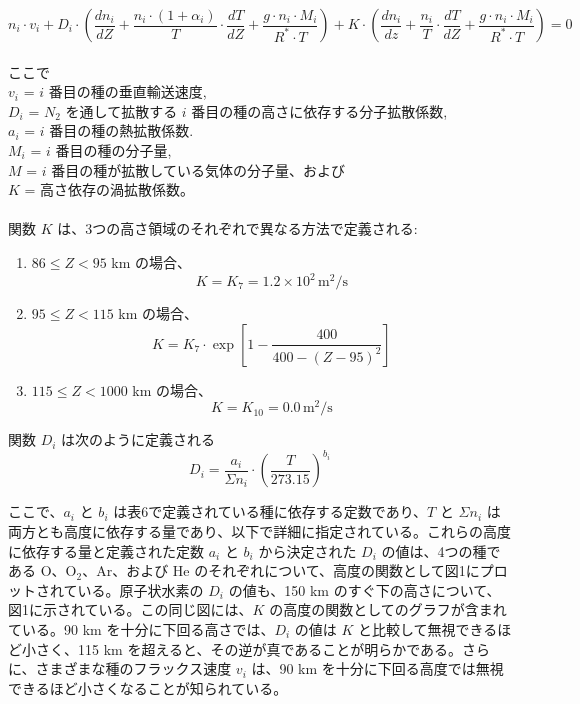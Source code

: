 \documentclass{article}
\begin{document}
\begin{equation}
  n_i \cdot v_i  + D_i \cdot \left ( \frac{dn_i}{dZ} + \frac{n_i \cdot (1 + \alpha_i)}{T} \cdot \frac{dT}{dZ} + \frac{g \cdot n_i \cdot M_i}{R^* \cdot T} \right ) + K \cdot \left ( \frac{dn_i}{dz} + \frac{n_i}{T} \cdot \frac{dT}{dZ}  + \frac{g \cdot n_i \cdot M_i}{R^* \cdot T} \right ) = 0 \tag{6}
\end{equation}\\
ここで\\
$v_i$ = $i$ 番目の種の垂直輸送速度,\\
$D_i$ = $N_2$ を通して拡散する $i$ 番目の種の高さに依存する分子拡散係数,\\
$a_i$ = $i$ 番目の種の熱拡散係数.\\
$M_i$ = $i$ 番目の種の分子量,\\
$M$ = $i$ 番目の種が拡散している気体の分子量、および\\
$K$ = 高さ依存の渦拡散係数。\\
\\関数 $K$ は、3つの高さ領域のそれぞれで異なる方法で定義される:\\
\begin{enumerate}
    \item $86 \leq Z < 95$ km の場合、
    \[
    K = K_7 = 1.2 \times 10^2 \, \text{m}^2/\text{s} \tag{7a}
    \]

    \item $95 \leq Z < 115$ km の場合、
    \[
    K = K_7 \cdot \exp\left[1 - \frac{400}{400 - (Z - 95)^2}\right] \tag{7b}
    \]

    \item $115 \leq Z < 1000$ km の場合、
    \[
    K = K_{10} = 0.0 \, \text{m}^2/\text{s} \tag{7c}
    \]
\end{enumerate}

関数 $D_i$ は次のように定義される
\[
D_i = \frac{a_i}{\Sigma n_i} \cdot \left(\frac{T}{273.15}\right)^{b_i} \tag{8}
\]

ここで、$a_i$ と $b_i$ は表6で定義されている種に依存する定数であり、$T$ と $\Sigma n_i$ は両方とも高度に依存する量であり、以下で詳細に指定されている。これらの高度に依存する量と定義された定数 $a_i$ と $b_i$ から決定された $D_i$ の値は、4つの種である O、O$_2$、Ar、および He のそれぞれについて、高度の関数として図1にプロットされている。原子状水素の $D_i$ の値も、150 km のすぐ下の高さについて、図1に示されている。この同じ図には、$K$ の高度の関数としてのグラフが含まれている。90 km を十分に下回る高さでは、$D_i$ の値は $K$ と比較して無視できるほど小さく、115 km を超えると、その逆が真であることが明らかである。さらに、さまざまな種のフラックス速度 $v_i$ は、90 km を十分に下回る高度では無視できるほど小さくなることが知られている。
\end{document}
